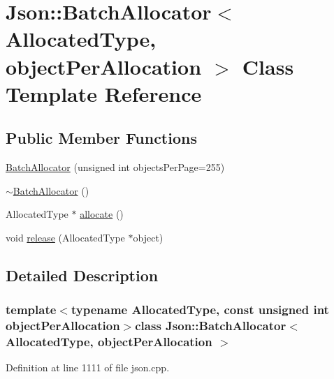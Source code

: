 \hypertarget{class_json_1_1_batch_allocator}{\section{Json\-:\-:Batch\-Allocator$<$ Allocated\-Type, object\-Per\-Allocation $>$ Class Template Reference}
\label{class_json_1_1_batch_allocator}
}
\subsection*{Public Member Functions}
\begin{DoxyCompactItemize}
\item 
\hyperlink{class_json_1_1_batch_allocator_a96aae4d9032847b074e72a0cf32bc9ea}{Batch\-Allocator} (unsigned int objects\-Per\-Page=255)
\item 
\hyperlink{class_json_1_1_batch_allocator_a823a98097ec40ccc8d88da9378be228d}{$\sim$\-Batch\-Allocator} ()
\item 
Allocated\-Type $\ast$ \hyperlink{class_json_1_1_batch_allocator_a4909756c2d33bd0f07662e88e4f850dd}{allocate} ()
\item 
void \hyperlink{class_json_1_1_batch_allocator_aceb116aceb6bb5bbcfd05433abc04ba5}{release} (Allocated\-Type $\ast$object)
\end{DoxyCompactItemize}


\subsection{Detailed Description}
\subsubsection*{template$<$typename Allocated\-Type, const unsigned int object\-Per\-Allocation$>$class Json\-::\-Batch\-Allocator$<$ Allocated\-Type, object\-Per\-Allocation $>$}



Definition at line 1111 of file json.\-cpp.



